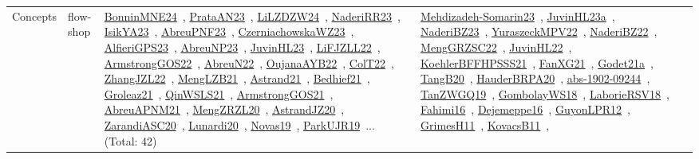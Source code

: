 {\begin{longtable}{lp{3cm}>{\raggedright\arraybackslash}p{6cm}>{\raggedright\arraybackslash}p{6cm}>{\raggedright\arraybackslash}p{8cm}}
Concepts & flow-shop & \href{../works/BonninMNE24.pdf}{BonninMNE24}~\cite{BonninMNE24}, \href{../works/PrataAN23.pdf}{PrataAN23}~\cite{PrataAN23}, \href{../works/LiLZDZW24.pdf}{LiLZDZW24}~\cite{LiLZDZW24}, \href{../works/NaderiRR23.pdf}{NaderiRR23}~\cite{NaderiRR23}, \href{../works/IsikYA23.pdf}{IsikYA23}~\cite{IsikYA23}, \href{../works/AbreuPNF23.pdf}{AbreuPNF23}~\cite{AbreuPNF23}, \href{../works/CzerniachowskaWZ23.pdf}{CzerniachowskaWZ23}~\cite{CzerniachowskaWZ23}, \href{../works/AlfieriGPS23.pdf}{AlfieriGPS23}~\cite{AlfieriGPS23}, \href{../works/AbreuNP23.pdf}{AbreuNP23}~\cite{AbreuNP23}, \href{../works/JuvinHL23.pdf}{JuvinHL23}~\cite{JuvinHL23}, \href{../works/LiFJZLL22.pdf}{LiFJZLL22}~\cite{LiFJZLL22}, \href{../works/ArmstrongGOS22.pdf}{ArmstrongGOS22}~\cite{ArmstrongGOS22}, \href{../works/AbreuN22.pdf}{AbreuN22}~\cite{AbreuN22}, \href{../works/OujanaAYB22.pdf}{OujanaAYB22}~\cite{OujanaAYB22}, \href{../works/ColT22.pdf}{ColT22}~\cite{ColT22}, \href{../works/ZhangJZL22.pdf}{ZhangJZL22}~\cite{ZhangJZL22}, \href{../works/MengLZB21.pdf}{MengLZB21}~\cite{MengLZB21}, \href{../works/Astrand21.pdf}{Astrand21}~\cite{Astrand21}, \href{../works/Bedhief21.pdf}{Bedhief21}~\cite{Bedhief21}, \href{../works/Groleaz21.pdf}{Groleaz21}~\cite{Groleaz21}, \href{../works/QinWSLS21.pdf}{QinWSLS21}~\cite{QinWSLS21}, \href{../works/ArmstrongGOS21.pdf}{ArmstrongGOS21}~\cite{ArmstrongGOS21}, \href{../works/AbreuAPNM21.pdf}{AbreuAPNM21}~\cite{AbreuAPNM21}, \href{../works/MengZRZL20.pdf}{MengZRZL20}~\cite{MengZRZL20}, \href{../works/AstrandJZ20.pdf}{AstrandJZ20}~\cite{AstrandJZ20}, \href{../works/ZarandiASC20.pdf}{ZarandiASC20}~\cite{ZarandiASC20}, \href{../works/Lunardi20.pdf}{Lunardi20}~\cite{Lunardi20}, \href{../works/Novas19.pdf}{Novas19}~\cite{Novas19}, \href{../works/ParkUJR19.pdf}{ParkUJR19}~\cite{ParkUJR19}... (Total: 42) & \href{../works/Mehdizadeh-Somarin23.pdf}{Mehdizadeh-Somarin23}~\cite{Mehdizadeh-Somarin23}, \href{../works/JuvinHL23a.pdf}{JuvinHL23a}~\cite{JuvinHL23a}, \href{../works/NaderiBZ23.pdf}{NaderiBZ23}~\cite{NaderiBZ23}, \href{../works/YuraszeckMPV22.pdf}{YuraszeckMPV22}~\cite{YuraszeckMPV22}, \href{../works/NaderiBZ22.pdf}{NaderiBZ22}~\cite{NaderiBZ22}, \href{../works/MengGRZSC22.pdf}{MengGRZSC22}~\cite{MengGRZSC22}, \href{../works/JuvinHL22.pdf}{JuvinHL22}~\cite{JuvinHL22}, \href{../works/KoehlerBFFHPSSS21.pdf}{KoehlerBFFHPSSS21}~\cite{KoehlerBFFHPSSS21}, \href{../works/FanXG21.pdf}{FanXG21}~\cite{FanXG21}, \href{../works/Godet21a.pdf}{Godet21a}~\cite{Godet21a}, \href{../works/TangB20.pdf}{TangB20}~\cite{TangB20}, \href{../works/HauderBRPA20.pdf}{HauderBRPA20}~\cite{HauderBRPA20}, \href{../works/abs-1902-09244.pdf}{abs-1902-09244}~\cite{abs-1902-09244}, \href{../works/TanZWGQ19.pdf}{TanZWGQ19}~\cite{TanZWGQ19}, \href{../works/GombolayWS18.pdf}{GombolayWS18}~\cite{GombolayWS18}, \href{../works/LaborieRSV18.pdf}{LaborieRSV18}~\cite{LaborieRSV18}, \href{../works/Fahimi16.pdf}{Fahimi16}~\cite{Fahimi16}, \href{../works/Dejemeppe16.pdf}{Dejemeppe16}~\cite{Dejemeppe16}, \href{../works/GuyonLPR12.pdf}{GuyonLPR12}~\cite{GuyonLPR12}, \href{../works/GrimesH11.pdf}{GrimesH11}~\cite{GrimesH11}, \href{../works/KovacsB11.pdf}{KovacsB11}~\cite{KovacsB11}, 
\end{longtable}}
